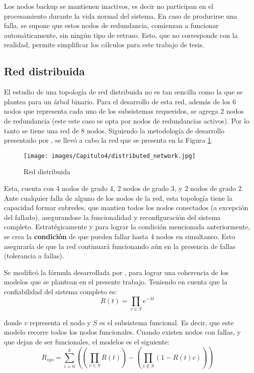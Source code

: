 Los nodos backup se mantienen inactivos, es decir no participan en el procesamiento durante la vida normal del sistema. En caso de producirse una falla, se supone que estos nodos de redundancia, comienzan a funcionar automáticamente, sin ningún tipo de retraso. Esto, que no corresponde con la realidad, permite simplificar los cálculos para este trabajo de tesis.

\subsection{Red distribuida}
El estudio de una topología de red distribuida no es tan sencilla como la que se plantea para un árbol binario. Para el desarrollo de esta red, además de los 6 nodos que representa cada uno de los subsistemas requeridos, se agrega 2 nodos de redundancia (este este caso se opta por nodos de redundancias activos). Por lo tanto se tiene una red de 8 nodos. Siguiendo la metodología de desarrollo presentado por \cite{Pradhan82}, se llevó a cabo la red que se presenta en la Figura \ref{fig:distributed_net}.

\begin{figure}[h]
 \centering
 \texttt{[image: images/Capitulo4/distributed\_network.jpg]}
  \caption{Red distribuida}
\label{fig:distributed_net}
\end{figure}

Esta, cuenta con 4 nodos de grado 4, 2 nodos de grado 3, y 2 nodos de grado 2. Ante cualquier falla de alguno de los nodos de la red, esta topología tiene la capacidad formar subredes, que mantien todos los nodos conectados (a excepción del fallado), asegurandose la funcionalidad y reconfiguración del sistema completo. Estratégicamente y para lograr la condición mencionada anteriormente, se crea la \textbf{condición} de que pueden fallar hasta 4 nodos en simultaneo. Esto aseguraría de que la red continuará funcionando aún en la presencia de fallas (tolerancia a fallas).

Se modificó la fórmula desarrollada  por \cite{Stivaros92}, para lograr una coherencia de los modelos que se plantean en el presente trabajo. Teniendo en cuenta que la confiabilidad del sistema completo es: $$R(t) = \prod_{v \in S} e^{- \lambda t}$$

donde $v$ representa el nodo y $S$ es el subsistema funcional. Es decir, que este modelo recorre todos los nodos funcionales. Cuando existen nodos con fallas, y que dejan de ser funcionales, el modelos es el siguiente: $$R_{sys} =\sum_{i=0}^{k} (( \prod_{v \in S} R(t)) - (\prod_{v \notin S} (1 -  R(t) c )))$$

